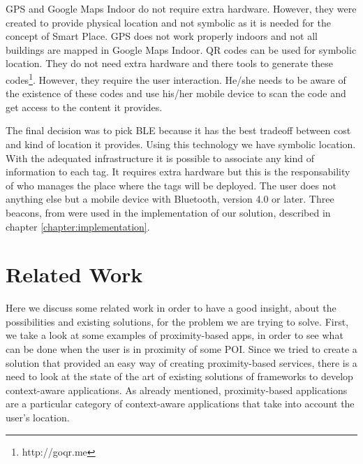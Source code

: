 

\gls{GPS} and Google Maps Indoor do not require extra hardware. However, they were created to provide physical location and not symbolic as it is needed for the concept of Smart Place.
\gls{GPS} does not work properly indoors and not all buildings are mapped in Google Maps Indoor.
\gls{QR} codes can be used for symbolic location. They do not need extra hardware and there tools to generate these codes\footnote{http://goqr.me}.
However, they require the user interaction. He/she needs to be aware of the existence of these codes and use his/her mobile device to scan the code and get access to the content it provides.

The final decision was to pick \gls{BLE} because it has the best tradeoff between cost and kind of location it provides. Using this technology we have symbolic location. With the adequated infrastructure it is possible to associate any kind of information to each tag.
It requires extra hardware but this is the responsability of who manages the place where the tags will be deployed.
The user does not anything else but a mobile device with Bluetooth, version 4.0 or later.
Three beacons, from  were used in the implementation of our solution, described in chapter \ref{chapter:implementation}.

\section{Related Work}
\label{sec:background_related_work}
Here we discuss some related work in order to have a good insight, about the possibilities and existing solutions, for the problem we are trying to solve.
First, we take a look at some examples of proximity-based apps, in order to see what can be done when the user is in proximity of some \gls{POI}.
Since we tried to create a solution that provided an easy way of creating proximity-based services, there is a need to look at the state of the art of existing solutions of frameworks to develop context-aware applications. As already mentioned, proximity-based applications are a particular category of context-aware applications that take into account the user's location.

